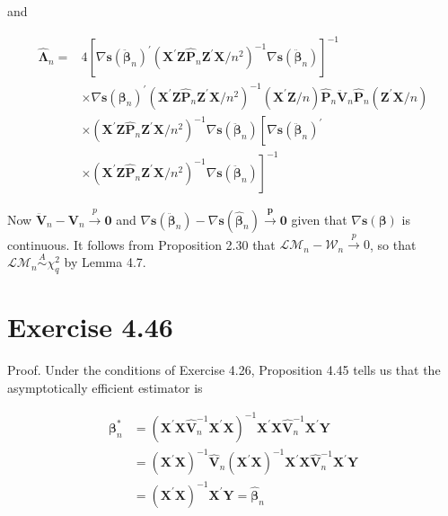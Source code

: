 \documentclass[10pt]{article}
\begin{document}
and

$$
\begin{aligned}
\hat{\boldsymbol{\Lambda}}_{n}= & 4\left[\nabla \mathbf{s}\left(\ddot{\boldsymbol{\beta}}_{n}\right)^{\prime}\left(\mathbf{X}^{\prime} \mathbf{Z} \hat{\mathbf{P}}_{n} \mathbf{Z}^{\prime} \mathbf{X} / n^{2}\right)^{-1} \nabla \mathbf{s}\left(\ddot{\boldsymbol{\beta}}_{n}\right)\right]^{-1} \\
& \times \nabla \mathbf{s}\left(\boldsymbol{\beta}_{n}\right)^{\prime}\left(\mathbf{X}^{\prime} \mathbf{Z} \hat{\mathbf{P}}_{n} \mathbf{Z}^{\prime} \mathbf{X} / n^{2}\right)^{-1}\left(\mathbf{X}^{\prime} \mathbf{Z} / n\right) \hat{\mathbf{P}}_{n} \ddot{\mathbf{V}}_{n} \hat{\mathbf{P}}_{n}\left(\mathbf{Z}^{\prime} \mathbf{X} / n\right) \\
& \times\left(\mathbf{X}^{\prime} \mathbf{Z} \hat{\mathbf{P}}_{n} \mathbf{Z}^{\prime} \mathbf{X} / n^{2}\right)^{-1} \nabla \mathbf{s}\left(\ddot{\boldsymbol{\beta}}_{n}\right)\left[\nabla \mathbf{s}\left(\ddot{\boldsymbol{\beta}}_{n}\right)^{\prime}\right. \\
& \left.\times\left(\mathbf{X}^{\prime} \mathbf{Z} \hat{\mathbf{P}}_{n} \mathbf{Z}^{\prime} \mathbf{X} / n^{2}\right)^{-1} \nabla \mathbf{s}\left(\ddot{\boldsymbol{\beta}}_{n}\right)\right]^{-1}
\end{aligned}
$$

Now $\ddot{\mathbf{V}}_{n}-\mathbf{V}_{n} \xrightarrow{p} \mathbf{0}$ and $\nabla \mathbf{s}\left(\ddot{\boldsymbol{\beta}}_{n}\right)-\nabla \mathbf{s}\left(\hat{\boldsymbol{\beta}}_{n}\right) \xrightarrow{\boldsymbol{p}} \mathbf{0}$ given that $\nabla \mathbf{s}(\boldsymbol{\beta})$ is continuous. It follows from Proposition 2.30 that $\mathcal{L} \mathcal{M}_{n}-\mathcal{W}_{n} \xrightarrow{p} 0$, so that $\mathcal{L} \mathcal{M}_{n} \stackrel{A}{\sim} \chi_{q}^{2}$ by Lemma 4.7.

\section*{Exercise 4.46}
Proof. Under the conditions of Exercise 4.26, Proposition 4.45 tells us that the asymptotically efficient estimator is

$$
\begin{aligned}
\boldsymbol{\beta}_{n}^{*} & =\left(\mathbf{X}^{\prime} \mathbf{X} \hat{\mathbf{V}}_{n}^{-1} \mathbf{X}^{\prime} \mathbf{X}\right)^{-1} \mathbf{X}^{\prime} \mathbf{X} \hat{\mathbf{V}}_{n}^{-1} \mathbf{X}^{\prime} \mathbf{Y} \\
& =\left(\mathbf{X}^{\prime} \mathbf{X}\right)^{-1} \hat{\mathbf{V}}_{n}\left(\mathbf{X}^{\prime} \mathbf{X}\right)^{-1} \mathbf{X}^{\prime} \mathbf{X} \hat{\mathbf{V}}_{n}^{-1} \mathbf{X}^{\prime} \mathbf{Y} \\
& =\left(\mathbf{X}^{\prime} \mathbf{X}\right)^{-1} \mathbf{X}^{\prime} \mathbf{Y}=\hat{\boldsymbol{\beta}}_{n}
\end{aligned}
$$
\end{document}
